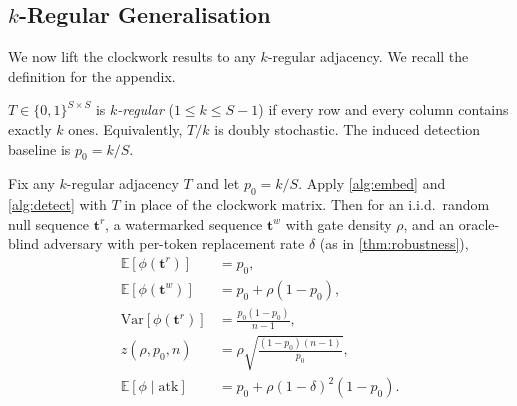 \subsection{$k$-Regular Generalisation}
\label{subsec:proof-kregular}

We now lift the clockwork results to any $k$-regular adjacency.  We
recall the definition for the appendix.

\begin{definition}
  \label{def:kregular}
  $T \in \{0,1\}^{S \times S}$ is \emph{$k$-regular} ($1 \leq k \leq
  S{-}1$) if every row and every column contains exactly $k$ ones.
  Equivalently, $T/k$ is doubly stochastic.  The induced detection
  baseline is $p_0 = k/S$.
\end{definition}

\begin{theorem}
  \label{thm:k-regular}%
  \label{prop:kregular}%
  Fix any $k$-regular adjacency $T$ and let $p_0 = k/S$.  Apply
  \autoref{alg:embed} and \autoref{alg:detect} with $T$ in place of
  the clockwork matrix.  Then for an i.i.d.\ random null sequence
  $\mathbf{t}^r$, a watermarked sequence $\mathbf{t}^w$ with gate
  density $\rho$, and an oracle-blind adversary with per-token
  replacement rate $\delta$ (as in \autoref{thm:robustness}),
  \begin{align}
    \mathbb{E}[\phi(\mathbf{t}^r)] &= p_0,
      \label{eq:kreg-null}\\
    \mathbb{E}[\phi(\mathbf{t}^w)] &= p_0 + \rho (1-p_0),
      \label{eq:kreg-wm}\\
    \mathrm{Var}[\phi(\mathbf{t}^r)]
      &= \tfrac{p_0 (1-p_0)}{n-1},
      \label{eq:kreg-var}\\
    z(\rho, p_0, n)
      &= \rho \sqrt{\tfrac{(1-p_0)(n-1)}{p_0}},
      \label{eq:kreg-z}\\
    \mathbb{E}[\phi \mid \mathrm{atk}]
      &= p_0 + \rho (1-\delta)^2 (1 - p_0).
      \label{eq:kreg-atk}
  \end{align}
\end{theorem}

